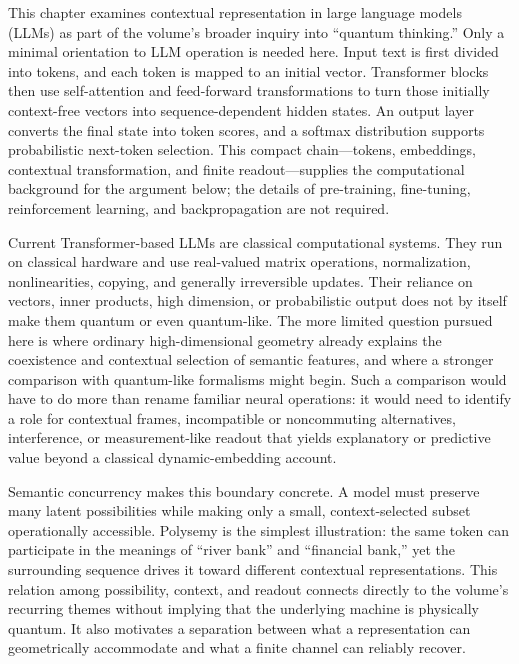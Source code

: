 \documentclass[
  aps,
  reprint,
  superscriptaddress,
  floatfix,
  nofootinbib,
  longbibliography
]{revtex4-2}
\begin{document}
This chapter examines contextual representation in large language models
(LLMs) as part of the volume's broader inquiry into ``quantum thinking.''
Only a minimal orientation to LLM operation is needed here.  Input text is
first divided into tokens, and each token is mapped to an initial vector.
Transformer blocks then use self-attention and feed-forward transformations
to turn those initially context-free vectors into sequence-dependent hidden
states.  An output layer converts the final state into token scores, and a
softmax distribution supports probabilistic next-token selection.  This
compact chain---tokens, embeddings, contextual transformation, and finite
readout---supplies the computational background for the argument below; the
details of pre-training, fine-tuning, reinforcement learning, and
backpropagation are not required.

Current Transformer-based LLMs are classical computational systems.  They
run on classical hardware and use real-valued matrix operations,
normalization, nonlinearities, copying, and generally irreversible updates.
Their reliance on vectors, inner products, high dimension, or probabilistic
output does not by itself make them quantum or even quantum-like.  The more
limited question pursued here is where ordinary high-dimensional geometry
already explains the coexistence and contextual selection of semantic
features, and where a stronger comparison with quantum-like formalisms might
begin.  Such a comparison would have to do more than rename familiar neural
operations: it would need to identify a role for contextual frames,
incompatible or noncommuting alternatives, interference, or
measurement-like readout that yields explanatory or predictive value beyond
a classical dynamic-embedding account.

Semantic concurrency makes this boundary concrete.  A model must preserve
many latent possibilities while making only a small, context-selected subset
operationally accessible.  Polysemy is the simplest illustration: the same
token can participate in the meanings of ``river bank'' and ``financial
bank,'' yet the surrounding sequence drives it toward different contextual
representations.  This relation among possibility, context, and readout
connects directly to the volume's recurring themes without implying that the
underlying machine is physically quantum.  It also motivates a separation
between what a representation can geometrically accommodate and what a
finite channel can reliably recover.
\end{document}
